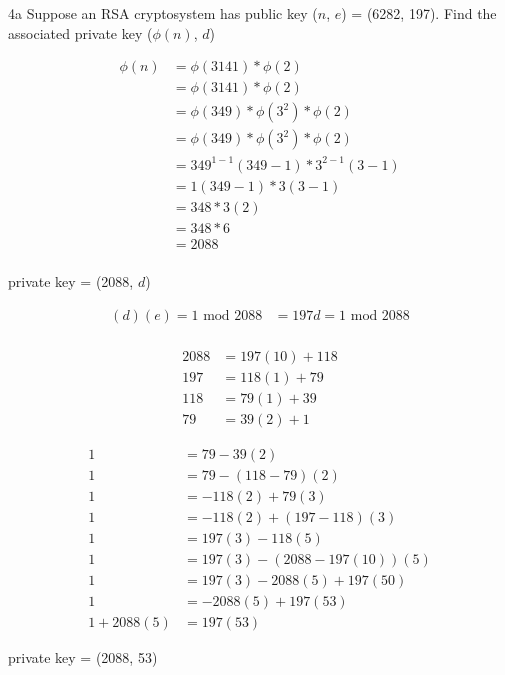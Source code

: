 \begin{question}{4a}
Suppose an RSA cryptosystem has public key ($n$, $e$) = (6282, 197). Find the associated private key ($\phi(n)$, $d$)

\begin{align*}
\phi(n) &= \phi(3141) * \phi(2) \\
        &= \phi(3141) * \phi(2) \\
        &= \phi(349) * \phi(3^2) * \phi(2) \\
        &= \phi(349) * \phi(3^2) * \phi(2) \\
        &= 349^{1-1}(349-1) * 3^{2-1}(3-1) \\
        &= 1(349-1) * 3(3-1) \\
        &= 348 * 3(2)\\
        &= 348 * 6 \\
        &= 2088 \\
\end{align*}

private key = (2088, $d$)

\begin{align*}
(d)(e) = 1 \textrm{ mod } 2088 &= 197d = 1 \textrm{ mod }  2088 \\
\end{align*}

\begin{align*}
2088 &= 197(10) + 118 \\
197 &=  118(1)  + 79\\
118 &=   79(1)  + 39\\
79  &=   39(2)  +  1
\end{align*}

\begin{align*}
1 &= 79 - 39(2)	\\
1 &= 79 - (118-79)(2)	\\
1 &= -118(2) +79(3)	\\
1 &= -118(2) + (197-118)(3)	\\
1 &= 197(3) -118(5)	\\
1 &= 197(3) -(2088-197(10))(5)	\\
1 &= 197(3) -2088(5) +197(50)	\\
1 &= -2088(5) +197(53)	\\
1 + 2088(5)&= 197(53)
\end{align*}

private key = (2088, 53)

\end{question}

